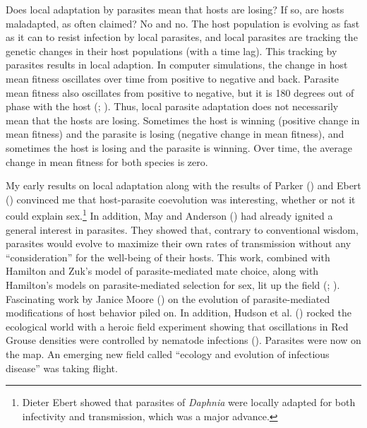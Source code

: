 \documentclass[
  letterpaper,
]{book}
\begin{document}
Does local adaptation by parasites mean that hosts are losing? If so,
are hosts maladapted, as often claimed? No and no. The host population
is evolving as fast as it can to resist infection by local parasites,
and local parasites are tracking the genetic changes in their host
populations (with a time lag). This tracking by parasites results in
local adaption. In computer simulations, the change in host mean fitness
oscillates over time from positive to negative and back. Parasite mean
fitness also oscillates from positive to negative, but it is 180 degrees
out of phase with the host (;
). Thus, local parasite
adaptation does not necessarily mean that the hosts are losing.
Sometimes the host is winning (positive change in mean fitness) and the
parasite is losing (negative change in mean fitness), and sometimes the
host is losing and the parasite is winning. Over time, the average
change in mean fitness for both species is zero.

My early results on local adaptation along with the results of Parker
() and Ebert
() convinced me that host-parasite
coevolution was interesting, whether or not it could explain
sex.\footnote{Dieter Ebert showed that parasites of \emph{Daphnia} were
  locally adapted for both infectivity and transmission, which was a
  major advance.} In addition, May and Anderson
() had already ignited a general interest
in parasites. They showed that, contrary to conventional wisdom,
parasites would evolve to maximize their own rates of transmission
without any ``consideration'' for the well-being of their hosts. This
work, combined with Hamilton and Zuk's model of parasite-mediated mate
choice, along with Hamilton's models on parasite-mediated selection for
sex, lit up the field (;
). Fascinating work by
Janice Moore () on the evolution of
parasite-mediated modifications of host behavior piled on. In addition,
Hudson et al. () rocked the ecological
world with a heroic field experiment showing that oscillations in Red
Grouse densities were controlled by nematode infections
(). Parasites were now on the map. An
emerging new field called ``ecology and evolution of infectious
disease'' was taking flight.
\end{document}
